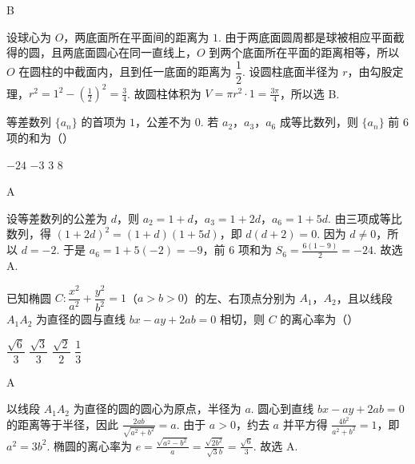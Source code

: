 \begin{answer}
B
\end{answer}

\begin{solution}
设球心为 \(O\)，两底面所在平面间的距离为 \(1\). 由于两底面圆周都是球被相应平面截得的圆，且两底面圆心在同一直线上，\(O\) 到两个底面所在平面的距离相等，所以 \(O\) 在圆柱的中截面内，且到任一底面的距离为 \(\dfrac12\). 设圆柱底面半径为 \(r\)，由勾股定理，\(r^2=1^2-\left(\frac12\right)^2=\frac34\).
故圆柱体积为 \(V=\pi r^2\cdot1=\frac{3\pi}{4}\)，所以选 B.
\end{solution}

\begin{problem}
等差数列 \(\{a_n\}\) 的首项为 \(1\)，公差不为 \(0\). 若 \(a_2\)，\(a_3\)，\(a_6\) 成等比数列，则 \(\{a_n\}\) 前 \(6\) 项的和为（\quad）

\choices
    {\(-24\)}
    {\(-3\)}
    {\(3\)}
    {\(8\)}
\end{problem}

\begin{answer}
A
\end{answer}

\begin{solution}
设等差数列的公差为 \(d\)，则 \(a_2=1+d\)，\(a_3=1+2d\)，\(a_6=1+5d\). 由三项成等比数列，得 \((1+2d)^2=(1+d)(1+5d)\)，即 \(d(d+2)=0\). 因为 \(d\ne0\)，所以 \(d=-2\). 于是 \(a_6=1+5(-2)=-9\)，前 \(6\) 项和为 \(S_6=\frac{6(1-9)}2=-24\).
故选 A.
\end{solution}

\begin{problem}
已知椭圆 \(C:\dfrac{x^2}{a^2}+\dfrac{y^2}{b^2}=1\)（\(a>b>0\)）的左、右顶点分别为 \(A_1\)，\(A_2\)，且以线段 \(A_1A_2\) 为直径的圆与直线 \(bx-ay+2ab=0\) 相切，则 \(C\) 的离心率为（\quad）

\choices
    {\(\dfrac{\sqrt6}{3}\)}
    {\(\dfrac{\sqrt3}{3}\)}
    {\(\dfrac{\sqrt2}{2}\)}
    {\(\dfrac{1}{3}\)}
\end{problem}

\begin{answer}
A
\end{answer}

\begin{solution}
以线段 \(A_1A_2\) 为直径的圆的圆心为原点，半径为 \(a\). 圆心到直线 \(bx-ay+2ab=0\) 的距离等于半径，因此 \(\frac{2ab}{\sqrt{a^2+b^2}}=a\).
由于 \(a>0\)，约去 \(a\) 并平方得 \(\frac{4b^2}{a^2+b^2}=1\)，即 \(a^2=3b^2\).
椭圆的离心率为 \(e=\frac{\sqrt{a^2-b^2}}a=\frac{\sqrt{2b^2}}{\sqrt3b}=\frac{\sqrt6}{3}\).
故选 A.
\end{solution}

